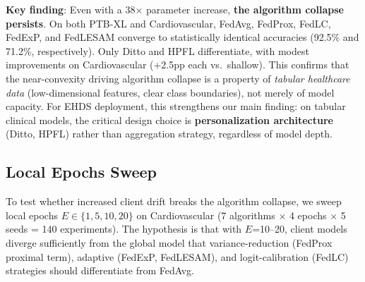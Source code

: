 \documentclass[conference,a4paper]{IEEEtran}
\begin{document}
\textbf{Key finding}: Even with a 38$\times$ parameter increase, \textbf{the algorithm collapse persists}. On both PTB-XL and Cardiovascular, FedAvg, FedProx, FedLC, FedExP, and FedLESAM converge to statistically identical accuracies (92.5\% and 71.2\%, respectively). Only Ditto and HPFL differentiate, with modest improvements on Cardiovascular (+2.5pp each vs.\ shallow). This confirms that the near-convexity driving algorithm collapse is a property of \textit{tabular healthcare data} (low-dimensional features, clear class boundaries), not merely of model capacity. For EHDS deployment, this strengthens our main finding: on tabular clinical models, the critical design choice is \textbf{personalization architecture} (Ditto, HPFL) rather than aggregation strategy, regardless of model depth.

\subsection{Local Epochs Sweep}
\label{sec:epochs_sweep}

To test whether increased client drift breaks the algorithm collapse, we sweep local epochs $E \in \{1, 5, 10, 20\}$ on Cardiovascular (7 algorithms $\times$ 4 epochs $\times$ 5 seeds = 140 experiments). The hypothesis is that with $E$=10--20, client models diverge sufficiently from the global model that variance-reduction (FedProx proximal term), adaptive (FedExP, FedLESAM), and logit-calibration (FedLC) strategies should differentiate from FedAvg.
\end{document}
